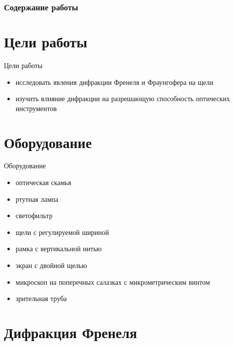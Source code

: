 \documentclass[11pt]{beamer} %
\begin{document}
\frame{\titlepage}

\begin{frame}
    \frametitle{Содержание работы}
    \tableofcontents
\end{frame}

\section{Цели работы}
    \begin{frame}{Цели работы}
        \begin{itemize}
            \item исследовать явления дифракции Френеля и Фраунгофера на щели
            \item изучить влияние дифракции на разрешающую способность оптических инструментов
        \end{itemize}
    \end{frame}

    \section{Оборудование}
    \begin{frame}{Оборудование}
        \begin{itemize}
            \item оптическая скамья
            \item ртутная лампа
            \item светофильтр
            \item щели с регулируемой шириной
            \item рамка с вертикальной нитью
            \item экран с двойной щелью
            \item микроскоп на поперечных салазках с микрометрическим винтом
            \item зрительная труба
        \end{itemize}
    \end{frame}

    \section{Дифракция Френеля} 
\end{document}
